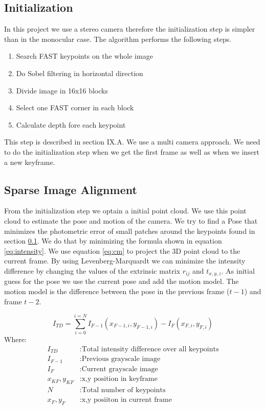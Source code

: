 \documentclass[11pt,a4paper,titlepage,oneside]{report}
\begin{document}
\subsection{Initialization}\label{sec:initialization}
In this project we use a stereo camera therefore the initialization step is simpler than in the monocular case. The algorithm performs the following steps.
\begin{enumerate}
	\item{Search FAST keypoints on the whole image}
	\item{Do Sobel filtering in horizontal direction}
	\item{Divide image in 16x16 blocks}
	\item{Select one FAST corner in each block}
	\item{Calculate depth fore each keypoint}
\end{enumerate}

This step is described in \cite{svo2} section IX.A. We use a multi camera approach. We need to do the initialization step when we get the first frame as well as when we insert a new keyframe.

\subsection{Sparse Image Alignment}\label{sec:sia}

From the initialization step we optain a initial point cloud. We use this point cloud to estimate the pose and motion of the camera. We try to find a Pose that minimizes the photometric error of small patches around the keypoints found in section \ref{sec:initialization}. We do that by minimizing the formula shown in equation \ref{eq:intensity}. We use equation \ref{eq:cm} to project the 3D point cloud to the current frame. By using Levenberg-Marquardt we can minimize the intensity difference by changing the values of the extrinsic matrix $r_{ij}$ and $t_{x,y,z}$. As initial guess for the pose we use the current pose and add the motion model. The motion model is the difference between the pose in the previous frame ($t-1$) and frame $t-2$.

\begin{equation}\label{eq:intensity}
	I_{TD}=\sum_{i=0}^{i=N}I_{F-1}(x_{F-1,i},y_{F-1,i})-I_{F}(x_{F,i},y_{F,i})
\end{equation}
Where:
\begin{align*}
	I_{TD} &:					\text{Total intensity difference over all keypoints}\\
	I_{F-1} &:				\text{Previous grayscale image}\\
	I_{F} &:					\text{Current grayscale image}\\
	x_{KF},y_{KF} &:	\text{x,y position in keyframe}\\
	N &:							\text{Total number of keypoints}\\
	x_{F},y_{F} &:		\text{x,y posiiton in current frame}
\end{align*}
\end{document}
